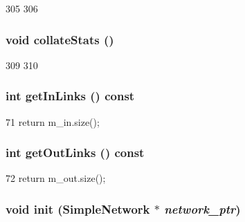 \begin{DoxyCode}
305 {
306 }
\end{DoxyCode}
\hypertarget{classPerfectSwitch_a208669cbc0bb1d52565956ca8c690c55}{
\subsubsection[{collateStats}]{\setlength{\rightskip}{0pt plus 5cm}void collateStats ()}}
\label{classPerfectSwitch_a208669cbc0bb1d52565956ca8c690c55}



\begin{DoxyCode}
309 {
310 }
\end{DoxyCode}
\hypertarget{classPerfectSwitch_a6b34df98756ca04e25a39378d1a7cc06}{
\subsubsection[{getInLinks}]{\setlength{\rightskip}{0pt plus 5cm}int getInLinks () const}}
\label{classPerfectSwitch_a6b34df98756ca04e25a39378d1a7cc06}



\begin{DoxyCode}
71 { return m_in.size(); }
\end{DoxyCode}
\hypertarget{classPerfectSwitch_adb57a9f7220739b3d11d85188ca7e87d}{
\subsubsection[{getOutLinks}]{\setlength{\rightskip}{0pt plus 5cm}int getOutLinks () const}}
\label{classPerfectSwitch_adb57a9f7220739b3d11d85188ca7e87d}



\begin{DoxyCode}
72 { return m_out.size(); }
\end{DoxyCode}
\hypertarget{classPerfectSwitch_a2c2a3eb1ad7853288ac72dc245aea836}{
\subsubsection[{init}]{\setlength{\rightskip}{0pt plus 5cm}void init ({\bf SimpleNetwork} $\ast$ {\em network\_\-ptr})}}
\label{classPerfectSwitch_a2c2a3eb1ad7853288ac72dc245aea836}



